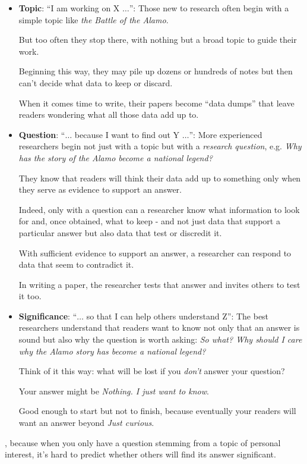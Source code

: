 \documentclass[oneside]{book}
\numberwithin{equation}{section}
\begin{document}
\begin{itemize}
    \item \textbf{Topic}: ``I am working on X $\ldots$'': Those new to research often begin with a simple topic like \textit{the Battle of the Alamo}.
    
    But too often they stop there, with nothing but a broad topic to guide their work.
    
    Beginning this way, they may pile up dozens or hundreds of notes but then can't decide what data to keep or discard.
    
    When it comes time to write, their papers become ``data dumps'' that leave readers wondering what all those data add up to.
    \item \textbf{Question}: ``$\ldots$ because I want to find out Y $\ldots$'': More experienced researchers begin not just with a topic but with a \textit{research question}, e.g. \textit{Why has the story of the Alamo become a national legend?}
    
    They know that readers will think their data add up to something only when they serve as evidence to support an answer.
    
    Indeed, only with a question can a researcher know what information to look for and, once obtained, what to keep - and not just data that support a particular answer but also data that test or discredit it.
    
    With sufficient evidence to support an answer, a researcher can respond to data that seem to contradict it.
    
    In writing a paper, the researcher tests that answer and invites others to test it too.
    \item \textbf{Significance}: ``$\ldots$ so that I can help others understand Z'': The best researchers understand that readers want to know not only that an answer is sound but also why the question is worth asking: \textit{So what? Why should I care why the Alamo story has become a national legend?}
    
    Think of it this way: what will be lost if you \textit{don't} answer your question?
    
    Your answer might be \textit{Nothing. I just want to know}.
    
    Good enough to start but not to finish, because eventually your readers will want an answer beyond \textit{Just curious}.
\end{itemize}
, because when you only have a question stemming from a topic of personal interest, it's hard to predict whether others will find its answer significant.
\end{document}

